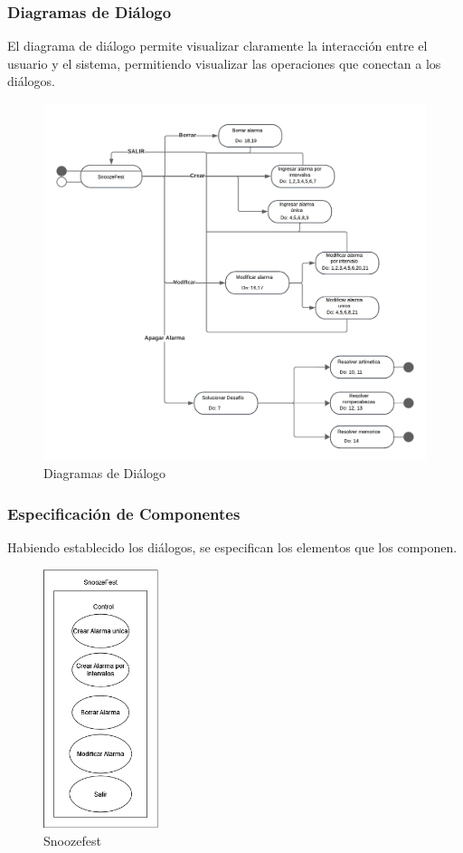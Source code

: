 \subsubsection{Diagramas de Diálogo}
El diagrama de diálogo permite visualizar claramente la interacción entre el usuario y el sistema, permitiendo visualizar las operaciones que conectan a los diálogos.
\begin{figure}[H]
	\centering
	\includegraphics[page=1,width=\textwidth]{./img/dialogos.pdf}
	\caption{Diagramas de Diálogo}
        \vspace{10pt}
	\label{fig:Diagrama de Diálogos}
\end{figure}
\newpage
\subsubsection{Especificación de Componentes}
Habiendo establecido los diálogos, se especifican los elementos que los componen.

\begin{figure}[H]
	\centering
	\includegraphics[width=0.3\textwidth]{./img/componentes/01-PrincipalSnoozefest.png}
	\caption{Snoozefest}
        \vspace{5pt}
	\label{fig:Snoozefest}
\end{figure}

